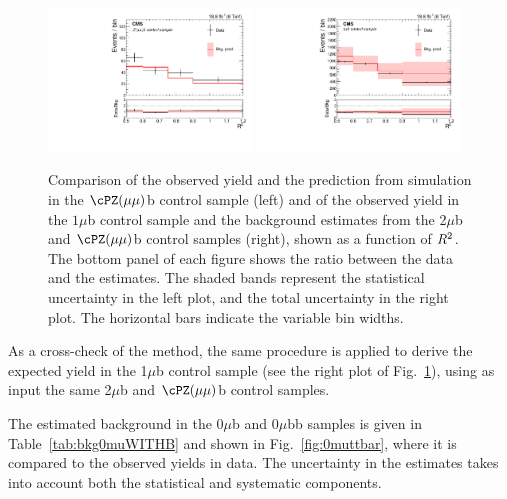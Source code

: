 \begin{figure}
\centering
   \includegraphics[width=0.48\textwidth]{BtagPlots/MC_CP_2Mu1LbZ_Sep.pdf}
   \includegraphics[width=0.48\textwidth]{BtagPlots/Closure_CP_1mu1Tb_SYS_Sep.pdf}
 \caption{Comparison of the observed yield and the
   prediction from simulation in the $\cPZ(\mu\mu)$b control sample (left)
   and of the observed yield in the $1\mu$b control sample and
   the background estimates from the 2$\mu$b and $\cPZ(\mu\mu)$b
   control samples (right), shown as a function of $R^2$. The bottom
   panel of each figure shows the ratio between the data and the
   estimates. The shaded bands represent the statistical uncertainty
   in the left plot, and the total uncertainty in the right plot. The horizontal bars indicate
the variable bin widths.\label{fig:Zmumub}}
\end{figure}

As a cross-check of the method, the same
procedure is applied to derive the expected yield in the 1$\mu$b
control sample (see the right plot of Fig.~\ref{fig:Zmumub}), using as input the same 2$\mu$b and $\cPZ(\mu\mu)$b
control samples.

The estimated background in the 0$\mu$b and 0$\mu$bb
samples is given in Table~\ref{tab:bkg0muWITHB} and shown in Fig.~\ref{fig:0muttbar}, where it is compared to
the observed yields in data. The uncertainty in the
estimates takes into account both the statistical and systematic
components.%

